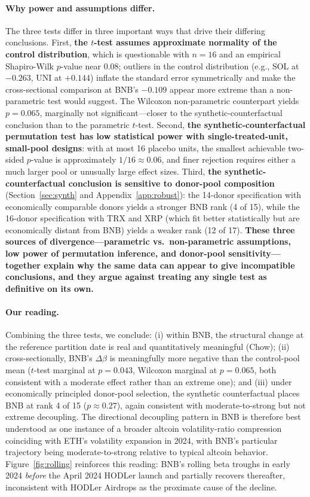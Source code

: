 \documentclass[11pt,a4paper]{article}
\begin{document}
\paragraph{Why power and assumptions differ.} The three tests differ in three important ways that drive their differing conclusions. First, \textbf{the $t$-test assumes approximate normality of the control distribution}, which is questionable with $n=16$ and an empirical Shapiro-Wilk $p$-value near 0.08; outliers in the control distribution (e.g., SOL at $-0.263$, UNI at $+0.144$) inflate the standard error symmetrically and make the cross-sectional comparison at BNB's $-0.109$ appear more extreme than a non-parametric test would suggest. The Wilcoxon non-parametric counterpart yields $p=0.065$, marginally not significant---closer to the synthetic-counterfactual conclusion than to the parametric $t$-test. Second, \textbf{the synthetic-counterfactual permutation test has low statistical power with single-treated-unit, small-pool designs}: with at most 16 placebo units, the smallest achievable two-sided $p$-value is approximately $1/16 \approx 0.06$, and finer rejection requires either a much larger pool or unusually large effect sizes. Third, \textbf{the synthetic-counterfactual conclusion is sensitive to donor-pool composition} (Section~\ref{sec:synth} and Appendix~\ref{app:robust}): the 14-donor specification with economically comparable donors yields a stronger BNB rank (4 of 15), while the 16-donor specification with TRX and XRP (which fit better statistically but are economically distant from BNB) yields a weaker rank (12 of 17). \textbf{These three sources of divergence---parametric vs.\ non-parametric assumptions, low power of permutation inference, and donor-pool sensitivity---together explain why the same data can appear to give incompatible conclusions, and they argue against treating any single test as definitive on its own.}

\paragraph{Our reading.} Combining the three tests, we conclude: (i) within BNB, the structural change at the reference partition date is real and quantitatively meaningful (Chow); (ii) cross-sectionally, BNB's $\Delta\beta$ is meaningfully more negative than the control-pool mean ($t$-test marginal at $p=0.043$, Wilcoxon marginal at $p=0.065$, both consistent with a moderate effect rather than an extreme one); and (iii) under economically principled donor-pool selection, the synthetic counterfactual places BNB at rank 4 of 15 ($p \approx 0.27$), again consistent with moderate-to-strong but not extreme decoupling. The directional decoupling pattern in BNB is therefore best understood as one instance of a broader altcoin volatility-ratio compression coinciding with ETH's volatility expansion in 2024, with BNB's particular trajectory being moderate-to-strong relative to typical altcoin behavior. Figure~\ref{fig:rolling} reinforces this reading: BNB's rolling beta troughs in early 2024 \emph{before} the April 2024 HODLer launch and partially recovers thereafter, inconsistent with HODLer Airdrops as the proximate cause of the decline.
\end{document}
